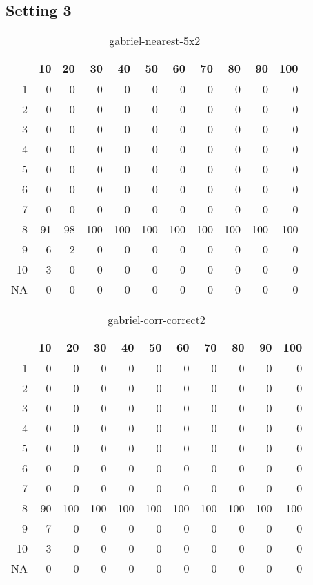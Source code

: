 \documentclass[11pt]{article}
\begin{document}
\subsection{Setting 3}

\begin{table}[H]
\centering
\begin{tabular}{rrrrrrrrrrr}
  \hline
 & 10 & 20 & 30 & 40 & 50 & 60 & 70 & 80 & 90 & 100 \\ 
  \hline
1 & 0 & 0 & 0 & 0 & 0 & 0 & 0 & 0 & 0 & 0 \\ 
  2 & 0 & 0 & 0 & 0 & 0 & 0 & 0 & 0 & 0 & 0 \\ 
  3 & 0 & 0 & 0 & 0 & 0 & 0 & 0 & 0 & 0 & 0 \\ 
  4 & 0 & 0 & 0 & 0 & 0 & 0 & 0 & 0 & 0 & 0 \\ 
  5 & 0 & 0 & 0 & 0 & 0 & 0 & 0 & 0 & 0 & 0 \\ 
  6 & 0 & 0 & 0 & 0 & 0 & 0 & 0 & 0 & 0 & 0 \\ 
  7 & 0 & 0 & 0 & 0 & 0 & 0 & 0 & 0 & 0 & 0 \\ 
  8 & 91 & 98 & 100 & 100 & 100 & 100 & 100 & 100 & 100 & 100 \\ 
  9 & 6 & 2 & 0 & 0 & 0 & 0 & 0 & 0 & 0 & 0 \\ 
  10 & 3 & 0 & 0 & 0 & 0 & 0 & 0 & 0 & 0 & 0 \\ 
  NA & 0 & 0 & 0 & 0 & 0 & 0 & 0 & 0 & 0 & 0 \\ 
   \hline
\end{tabular}
\caption{gabriel-nearest-5x2} 
\end{table}
\begin{table}[H]
\centering
\begin{tabular}{rrrrrrrrrrr}
  \hline
 & 10 & 20 & 30 & 40 & 50 & 60 & 70 & 80 & 90 & 100 \\ 
  \hline
1 & 0 & 0 & 0 & 0 & 0 & 0 & 0 & 0 & 0 & 0 \\ 
  2 & 0 & 0 & 0 & 0 & 0 & 0 & 0 & 0 & 0 & 0 \\ 
  3 & 0 & 0 & 0 & 0 & 0 & 0 & 0 & 0 & 0 & 0 \\ 
  4 & 0 & 0 & 0 & 0 & 0 & 0 & 0 & 0 & 0 & 0 \\ 
  5 & 0 & 0 & 0 & 0 & 0 & 0 & 0 & 0 & 0 & 0 \\ 
  6 & 0 & 0 & 0 & 0 & 0 & 0 & 0 & 0 & 0 & 0 \\ 
  7 & 0 & 0 & 0 & 0 & 0 & 0 & 0 & 0 & 0 & 0 \\ 
  8 & 90 & 100 & 100 & 100 & 100 & 100 & 100 & 100 & 100 & 100 \\ 
  9 & 7 & 0 & 0 & 0 & 0 & 0 & 0 & 0 & 0 & 0 \\ 
  10 & 3 & 0 & 0 & 0 & 0 & 0 & 0 & 0 & 0 & 0 \\ 
  NA & 0 & 0 & 0 & 0 & 0 & 0 & 0 & 0 & 0 & 0 \\ 
   \hline
\end{tabular}
\caption{gabriel-corr-correct2} 
\end{table}
\end{document}
